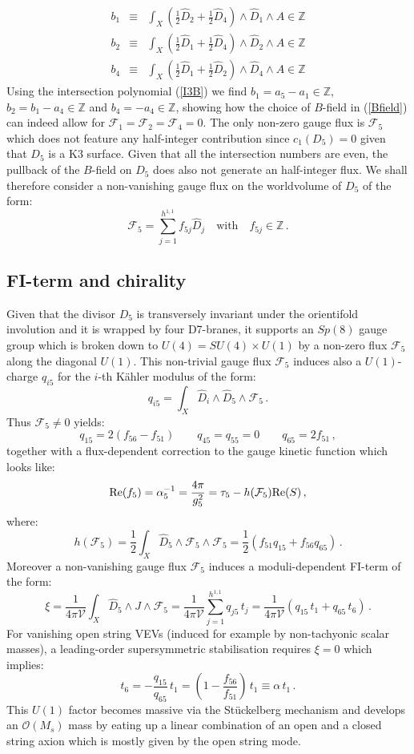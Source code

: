 \documentclass[11pt,a4paper]{article}
\newcommand{\bea}{\begin{eqnarray}}
\newcommand{\eea}{\end{eqnarray}}
\newcommand{\be}{\begin{equation}}
\newcommand{\ee}{\end{equation}}
\newcommand{\F}{\mathcal{F}}
\def\nn{\nonumber}
\newcommand\vo{{\mathcal{V}}}
\newcommand{\mc}{\mathcal}
\begin{document}
\bea
b_1 &\equiv& \int_X \left(\frac12 \hat{D}_2 + \frac12 \hat{D}_4 \right) \wedge \hat{D}_1 \wedge A \in \mathbb{Z} \nn \\
b_2 &\equiv& \int_X \left(\frac12 \hat{D}_1 + \frac12 \hat{D}_4 \right) \wedge \hat{D}_2 \wedge A \in \mathbb{Z} \nn \\
b_4 &\equiv& \int_X \left(\frac12 \hat{D}_1 + \frac12 \hat{D}_2 \right) \wedge \hat{D}_4 \wedge A \in \mathbb{Z} \nn
\eea
Using the intersection polynomial (\ref{I3B}) we find $b_1= a_5-a_1 \in \mathbb{Z}$, $b_2 = b_1 -a_4 \in \mathbb{Z}$ and $b_4 = -a_4 \in \mathbb{Z}$, 
showing how the choice of $B$-field in (\ref{Bfield}) can indeed allow for $\F_1=\F_2=\F_4=0$. The only non-zero gauge flux is $\F_5$ which does not feature any half-integer contribution since $c_1(D_5)=0$ given that $D_5$ is a K3 surface. Given that all the intersection numbers are even, the pullback of the $B$-field on $D_5$ does also not generate an half-integer flux. We shall therefore consider a non-vanishing gauge flux on the worldvolume of $D_5$ of the form:
\be
\F_5 = \sum_{j=1}^{h^{1,1}} f_{5j}\hat{D}_j \quad\text{with}\quad f_{5j}\in \mathbb{Z}\,.
\ee

\subsection{FI-term and chirality}

Given that the divisor $D_5$ is transversely invariant under the orientifold involution and it is wrapped by four D7-branes, it supports an $Sp(8)$ gauge group which is broken down to $U(4)=SU(4)\times U(1)$ by a non-zero flux $\F_5$ along the diagonal $U(1)$. This non-trivial gauge flux $\F_5$ induces also a $U(1)$-charge $q_{i5}$ for the $i$-th K\"ahler modulus of the form:
\be
q_{i5} = \int_X \hat{D}_i \wedge \hat{D}_5 \wedge \F_5 \,.
\ee
Thus $\F_5\neq 0$ yields:
\be
q_{15} = 2 (f_{56} - f_{51}) \qquad q_{45} = q_{55} = 0 \qquad q_{65} = 2 f_{51}\,,
\ee
together with a flux-dependent correction to the gauge kinetic function which looks like:
\be
{\rm Re}(f_5)  = \alpha_5^{-1}=\frac{4\pi}{g_5^2}=\tau_5-h(\F_5) {\rm Re}(S)\,,
\ee
where: 
\be
h(\F_5) =\frac12 \int_X \hat{D}_5 \wedge \F_5 \wedge \F_5 =\frac12\left(f_{51} q_{15} + f_{56} q_{65}\right)\,.
\ee
Moreover a non-vanishing gauge flux $\F_5$ induces a moduli-dependent FI-term of the form:
\be
\xi =\frac{1}{4\pi\vo}\int_X \hat{D}_5\wedge J\wedge\F_5=\frac{1}{4\pi\vo}\sum_{j=1}^{h^{1,1}} q_{j5}\,t_j
=\frac{1}{4\pi\vo} \left(q_{15}\,t_1+q_{65}\,t_6\right)\,.
\ee
For vanishing open string VEVs (induced for example by non-tachyonic scalar masses), a leading-order supersymmetric stabilisation requires $\xi=0$ which implies:
\be
t_6 = - \frac{q_{15}}{q_{65}}\,t_1= \left(1-\frac{f_{56}}{f_{51}}\right) \,t_1 \equiv \alpha\,t_1\,.
\label{Dfix}
\ee
This $U(1)$ factor becomes massive via the St\"uckelberg mechanism and develops an $\mc{O}(M_s)$ mass by eating up a linear combination of an open and a closed string axion which is mostly given by the open string mode. 
\end{document}
